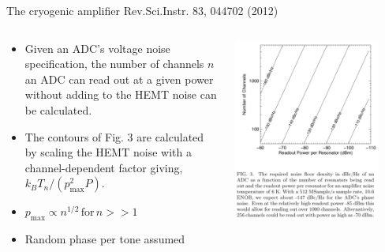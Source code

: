 \documentclass[ignorenonframetext,12pt]{beamer}
\begin{document}
\begin{frame}{The cryogenic amplifier}
				Rev.Sci.Instr. 83, 044702 (2012)
				\begin{columns}
								\begin{column}{0.45\textwidth}
												\begin{itemize}
																\item \footnotesize{Given an ADC's voltage noise
																				specification, the number of channels
																				$n$ an ADC can read out at a given power
																				without adding to the HEMT noise can be
																				calculated.}
																\item The contours of Fig. 3 are calculated by
																				scaling the HEMT noise with a
																				channel-dependent factor giving, $k_B
																				T_n /(p_\text{max}^2 P)$.
																\item $p_\text{max} \propto
																				n^{1/2}\,\text{for}\,n >> 1$
																\item Random phase per tone assumed
												\end{itemize}
								\end{column}
								\begin{column}{0.45\textwidth}
								\includegraphics[width=0.85\textwidth]{power_vs_Nchannels}
								\end{column}
				\end{columns}
\end{frame}
\end{document}
